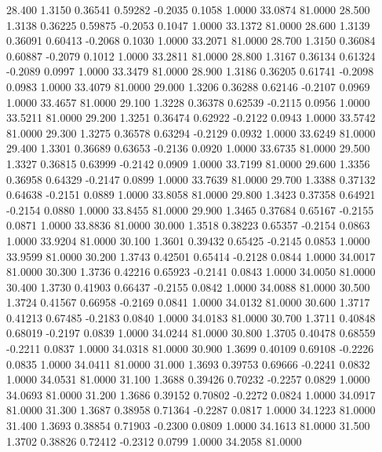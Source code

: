   28.400   1.3150   0.36541   0.59282  -0.2035   0.1058   1.0000  33.0874  81.0000
  28.500   1.3138   0.36225   0.59875  -0.2053   0.1047   1.0000  33.1372  81.0000
  28.600   1.3139   0.36091   0.60413  -0.2068   0.1030   1.0000  33.2071  81.0000
  28.700   1.3150   0.36084   0.60887  -0.2079   0.1012   1.0000  33.2811  81.0000
  28.800   1.3167   0.36134   0.61324  -0.2089   0.0997   1.0000  33.3479  81.0000
  28.900   1.3186   0.36205   0.61741  -0.2098   0.0983   1.0000  33.4079  81.0000
  29.000   1.3206   0.36288   0.62146  -0.2107   0.0969   1.0000  33.4657  81.0000
  29.100   1.3228   0.36378   0.62539  -0.2115   0.0956   1.0000  33.5211  81.0000
  29.200   1.3251   0.36474   0.62922  -0.2122   0.0943   1.0000  33.5742  81.0000
  29.300   1.3275   0.36578   0.63294  -0.2129   0.0932   1.0000  33.6249  81.0000
  29.400   1.3301   0.36689   0.63653  -0.2136   0.0920   1.0000  33.6735  81.0000
  29.500   1.3327   0.36815   0.63999  -0.2142   0.0909   1.0000  33.7199  81.0000
  29.600   1.3356   0.36958   0.64329  -0.2147   0.0899   1.0000  33.7639  81.0000
  29.700   1.3388   0.37132   0.64638  -0.2151   0.0889   1.0000  33.8058  81.0000
  29.800   1.3423   0.37358   0.64921  -0.2154   0.0880   1.0000  33.8455  81.0000
  29.900   1.3465   0.37684   0.65167  -0.2155   0.0871   1.0000  33.8836  81.0000
  30.000   1.3518   0.38223   0.65357  -0.2154   0.0863   1.0000  33.9204  81.0000
  30.100   1.3601   0.39432   0.65425  -0.2145   0.0853   1.0000  33.9599  81.0000
  30.200   1.3743   0.42501   0.65414  -0.2128   0.0844   1.0000  34.0017  81.0000
  30.300   1.3736   0.42216   0.65923  -0.2141   0.0843   1.0000  34.0050  81.0000
  30.400   1.3730   0.41903   0.66437  -0.2155   0.0842   1.0000  34.0088  81.0000
  30.500   1.3724   0.41567   0.66958  -0.2169   0.0841   1.0000  34.0132  81.0000
  30.600   1.3717   0.41213   0.67485  -0.2183   0.0840   1.0000  34.0183  81.0000
  30.700   1.3711   0.40848   0.68019  -0.2197   0.0839   1.0000  34.0244  81.0000
  30.800   1.3705   0.40478   0.68559  -0.2211   0.0837   1.0000  34.0318  81.0000
  30.900   1.3699   0.40109   0.69108  -0.2226   0.0835   1.0000  34.0411  81.0000
  31.000   1.3693   0.39753   0.69666  -0.2241   0.0832   1.0000  34.0531  81.0000
  31.100   1.3688   0.39426   0.70232  -0.2257   0.0829   1.0000  34.0693  81.0000
  31.200   1.3686   0.39152   0.70802  -0.2272   0.0824   1.0000  34.0917  81.0000
  31.300   1.3687   0.38958   0.71364  -0.2287   0.0817   1.0000  34.1223  81.0000
  31.400   1.3693   0.38854   0.71903  -0.2300   0.0809   1.0000  34.1613  81.0000
  31.500   1.3702   0.38826   0.72412  -0.2312   0.0799   1.0000  34.2058  81.0000
